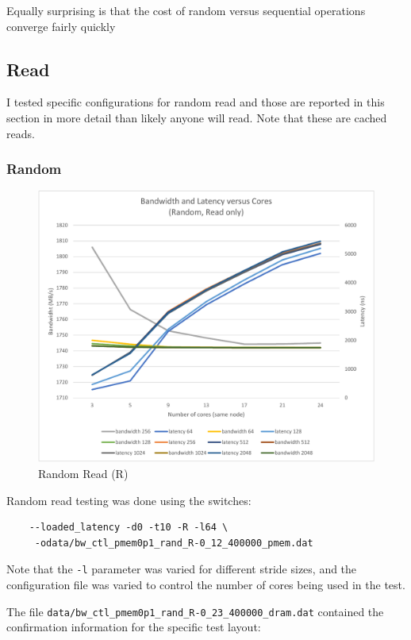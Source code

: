 Equally surprising is that the cost of random versus sequential
operations converge fairly quickly

\subsection{Read}\label{mlc:r}

I tested specific configurations for random read and those are
reported in this section in more detail than likely anyone will read.
Note that these are cached reads.

\subsubsection{Random}\label{mlc:r:rand}
\begin{figure}
    \centering
    \caption{Random Read (R)}\label{chart:random:read}
    \includegraphics[scale=0.5]{charts/random-r-crop.pdf}
\end{figure}

Random read testing was done using the switches:

\begin{verbatim}
    --loaded_latency -d0 -t10 -R -l64 \
     -odata/bw_ctl_pmem0p1_rand_R-0_12_400000_pmem.dat
\end{verbatim}

Note that the \verb+-l+ parameter was varied for different
stride sizes, and the configuration file was varied to control
the number of cores being used in the test.

The file \verb+data/bw_ctl_pmem0p1_rand_R-0_23_400000_dram.dat+ contained the confirmation information
for the specific test layout:

